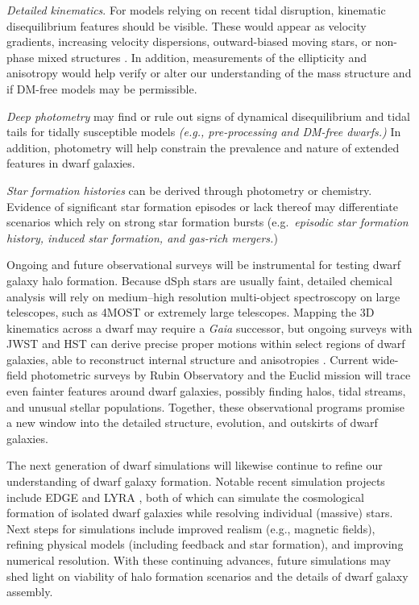 \emph{Detailed kinematics}. For models relying on recent tidal
disruption, kinematic disequilibrium features should be visible. These
would appear as velocity gradients, increasing velocity dispersions,
outward-biased moving stars, or non-phase mixed structures
\citep[e.g,][]{kroupa1997, read+2006, sanchez-salcedo+hernandez2007}. In
addition, measurements of the ellipticity and anisotropy would help
verify or alter our understanding of the mass structure and if DM-free
models may be permissible.

\emph{Deep photometry} may find or rule out signs of dynamical
disequilibrium and tidal tails for tidally susceptible models
\emph{(e.g., pre-processing and DM-free dwarfs.)} In addition,
photometry will help constrain the prevalence and nature of extended
features in dwarf galaxies.

\emph{Star formation histories} can be derived through photometry or
chemistry. Evidence of significant star formation episodes or lack
thereof may differentiate scenarios which rely on strong star formation
bursts (e.g.~\emph{episodic star formation history, induced star
formation, and gas-rich mergers.})

Ongoing and future observational surveys will be instrumental for
testing dwarf galaxy halo formation. Because dSph stars are usually
faint, detailed chemical analysis will rely on medium--high resolution
multi-object spectroscopy on large telescopes, such as 4MOST
\citep{skuladottir+2023} or extremely large telescopes. Mapping the 3D
kinematics across a dwarf may require a \emph{Gaia} successor, but
ongoing surveys with JWST and HST can derive precise proper motions
within select regions of dwarf galaxies, able to reconstruct internal
structure and anisotropies \citep[e.g.,][]{vitral+2025}. Current
wide-field photometric surveys by Rubin Observatory \citep{ivezic+2019}
and the Euclid mission \citep{euclidcollaboration+2025} will trace even
fainter features around dwarf galaxies, possibly finding halos, tidal
streams, and unusual stellar populations. Together, these observational
programs promise a new window into the detailed structure, evolution,
and outskirts of dwarf galaxies.

The next generation of dwarf simulations will likewise continue to
refine our understanding of dwarf galaxy formation. Notable recent
simulation projects include EDGE \citep{agertz+2020} and LYRA
\citep{gutcke+2021}, both of which can simulate the cosmological
formation of isolated dwarf galaxies while resolving individual
(massive) stars. Next steps for simulations include improved realism
(e.g., magnetic fields), refining physical models (including feedback
and star formation), and improving numerical resolution. With these
continuing advances, future simulations may shed light on viability of
halo formation scenarios and the details of dwarf galaxy assembly.


